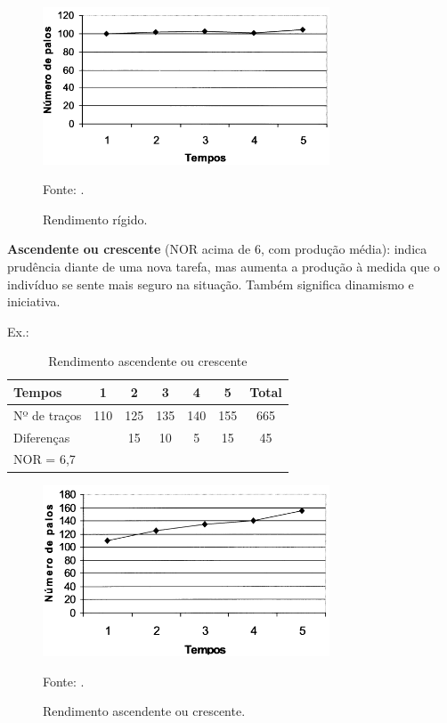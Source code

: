 \begin{figure}[H]
 \centering
 \includegraphics[width=0.76\textwidth]{./fig/grafico-rendimento/rigido}
 \caption{Rendimento rígido.}
  Fonte: \cite{psicohood2018}.
 \label{fig:folhas}
\end{figure}

\textbf{Ascendente ou crescente} (NOR acima de 6, com produção média): indica prudência diante de uma nova tarefa, mas aumenta a produção à medida que o indivíduo se sente mais seguro na situação. Também significa dinamismo e iniciativa.

Ex.:
\begin{table}[hp]
\caption{Rendimento ascendente ou crescente \cite{psicohood2018} }
\label{tab:ascende} 
\centering
\begin{tabular}{|l|c|c|c|c|c|c|}
\hline Tempos       & 1     & 2     & 3    &  4     & 5     & Total \\ 
\hline Nº de traços & 110 & 125 & 135 & 140 & 155 & 665 \\ 
\hline    \multicolumn{2}{|l|}{ Diferenças}& 15   & 10     & 5     & 15    & 45\\ 
\hline NOR = 6,7\\  \cline{1-1}
\end{tabular} 

\end{table}

\begin{figure}[H]
 \centering
 \includegraphics[width=0.76\textwidth]{./fig/grafico-rendimento/crescente}
 \caption{Rendimento ascendente ou crescente.}
  Fonte: \cite{psicohood2018}.
 \label{fig:ascende}
\end{figure}

